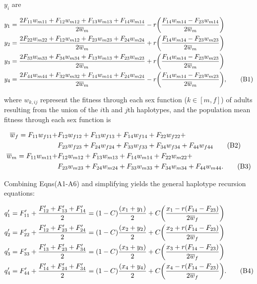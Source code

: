 \documentclass{article}
\newcommand\numberthis{\addtocounter{equation}{1}\tag{\theequation}}
\begin{document}
\noindent{} $y_{i}$ are

\begin{align*}
	y_1 &= \frac{2 F_{11} w_{m11} + F_{12} w_{m12} + F_{13} w_{m13} + F_{14} w_{m14}}{2 \overline{w}_m} - r \bigg( \frac{F_{14} w_{m14} - F_{23} w_{m14}}{2 \overline{w}_m} \bigg) \\
	y_2 &= \frac{2 F_{22} w_{m22} + F_{12} w_{m12} + F_{23} w_{m23} + F_{24} w_{m24}}{2 \overline{w}_m} + r \bigg( \frac{F_{14} w_{m14} - F_{23} w_{m23}}{2 \overline{w}_m} \bigg) \\
	y_3 &= \frac{2 F_{33} w_{m33} + F_{34} w_{m34} + F_{13} w_{m13} + F_{23} w_{m23}}{2 \overline{w}_m} + r \bigg( \frac{F_{14} w_{m14} - F_{23} w_{m23}}{2 \overline{w}_m} \bigg) \\
	y_4 &= \frac{2 F_{44} w_{m44} + F_{32} w_{m32} + F_{14} w_{m14} + F_{24} w_{m24}}{2 \overline{w}_m} - r \bigg( \frac{F_{14} w_{m14} - F_{23} w_{m23}}{2 \overline{w}_m} \bigg), \numberthis
\end{align*}

\noindent{} where ${w}_{k,ij}$ represent the fitness through each sex function ($k \in [m,f]$) of adults resulting from the union of the $i$th and $j$th haplotypes, and the population mean fitness through each sex function is

\begin{align*}
	\overline{w}_f = F_{11} w_{f11} + &F_{12} w_{f12} + F_{13} w_{f13} + F_{14} w_{f14} + F_{22} w_{f22} + \\ 
				     &F_{23} w_{f23} + F_{24} w_{f24} + F_{33} w_{f33} + F_{34} w_{f34} + F_{44} w_{f44} \numberthis \\
	\overline{w}_m = F_{11} w_{m11} + &F_{12} w_{m12} + F_{13} w_{m13} + F_{14} w_{m14} + F_{22} w_{m22} + \\
				     &F_{23} w_{m23} + F_{24} w_{m24} + F_{33} w_{m33} + F_{34} w_{m34} + F_{44} w_{m44}. \numberthis
\end{align*}


Combining Eqns(A1-A6) and simplifying yields the general haplotype recursion equations: 

\begin{align*} \label{eq:hapRec}
	q'_1 &= F'_{11} + \frac{F'_{12} + F'_{13} + F'_{14}}{2} = (1 - C) \frac{(x_1 + y_1)}{2} + C \bigg( \frac{x_1 - r(F_{14} - F_{23})}{2 \overline{w}_f} \bigg) \\
	q'_2 &= F'_{22} + \frac{F'_{12} + F'_{23} + F'_{24}}{2} = (1 - C) \frac{(x_2 + y_2)}{2} + C \bigg( \frac{x_2 + r(F_{14} - F_{23})}{2 \overline{w}_f} \bigg) \\
	q'_3 &= F'_{33} + \frac{F'_{13} + F'_{23} + F'_{34}}{2} = (1 - C) \frac{(x_3 + y_3)}{2} + C \bigg( \frac{x_3 + r(F_{14} - F_{23})}{2 \overline{w}_f} \bigg) \\
	q'_4 &= F'_{44} + \frac{F'_{14} + F'_{24} + F'_{34}}{2} = (1 - C) \frac{(x_4 + y_4)}{2} + C \bigg( \frac{x_4 - r(F_{14} - F_{23})}{2 \overline{w}_f} \bigg). \numberthis
\end{align*}
\end{document}

